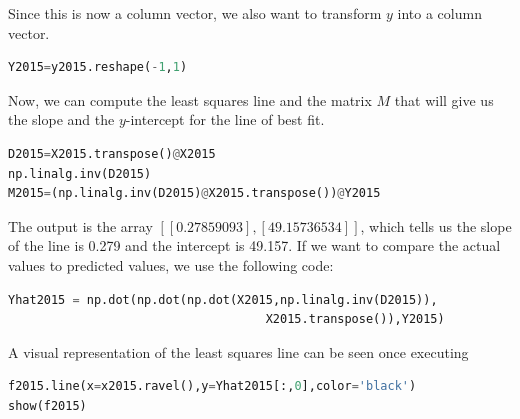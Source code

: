\documentclass[12pt]{article}
\begin{document}
Since this is now a column vector, we also want to transform $y$ into a column vector.
\begin{adjustwidth}{0.5in}{0.25in}
\begin{lstlisting}[language=Python]
Y2015=y2015.reshape(-1,1)
\end{lstlisting}
\end{adjustwidth}

Now, we can compute the least squares line and the matrix $M$ that will give us the slope and the $y$-intercept for the line of best fit.
\begin{adjustwidth}{0.5in}{0.25in}
\begin{lstlisting}[language=Python]
D2015=X2015.transpose()@X2015
np.linalg.inv(D2015)
M2015=(np.linalg.inv(D2015)@X2015.transpose())@Y2015
\end{lstlisting}
\end{adjustwidth}

The output is the array $[[0.27859093],[49.15736534]]$, which tells us the slope of the line is 0.279 and the intercept is 49.157. If we want to compare the actual values to predicted values, we use the following code:
\begin{adjustwidth}{0.5in}{0.25in}
\begin{lstlisting}[language=Python]
Yhat2015 = np.dot(np.dot(np.dot(X2015,np.linalg.inv(D2015)),
                                    X2015.transpose()),Y2015)
\end{lstlisting}
\end{adjustwidth}

A visual representation of the least squares line can be seen once executing
\begin{adjustwidth}{0.5in}{0.25in}
\begin{lstlisting}[language=Python]
f2015.line(x=x2015.ravel(),y=Yhat2015[:,0],color='black')
show(f2015)
\end{lstlisting}
\end{adjustwidth}

\vspace{-130pt}
\end{document}
